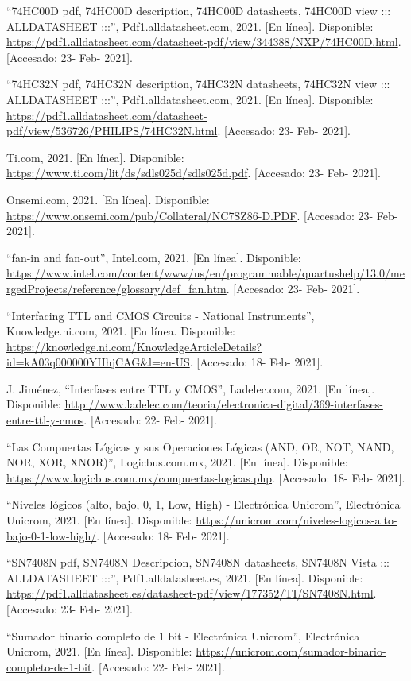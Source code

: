 \documentclass[journal]{IEEEtran}
\begin{document}
	\begin{thebibliography}{1}
		
		 “74HC00D pdf, 74HC00D description, 74HC00D datasheets, 74HC00D view ::: ALLDATASHEET :::”, Pdf1.alldatasheet.com, 2021. [En línea]. Disponible: \url{https://pdf1.alldatasheet.com/datasheet-pdf/view/344388/NXP/74HC00D.html}. [Accesado: 23- Feb- 2021].
		
		 “74HC32N pdf, 74HC32N description, 74HC32N datasheets, 74HC32N view ::: ALLDATASHEET :::”, Pdf1.alldatasheet.com, 2021. [En línea]. Disponible: \url{https://pdf1.alldatasheet.com/datasheet-pdf/view/536726/PHILIPS/74HC32N.html}. [Accesado: 23- Feb- 2021].
		
		 Ti.com, 2021. [En línea]. Disponible: \url{https://www.ti.com/lit/ds/sdls025d/sdls025d.pdf}. [Accesado: 23- Feb- 2021].
		
		 Onsemi.com, 2021. [En línea]. Disponible: \url{https://www.onsemi.com/pub/Collateral/NC7SZ86-D.PDF}. [Accesado: 23- Feb- 2021].
		
		 “fan-in and fan-out”, Intel.com, 2021. [En línea]. Disponible: \url{https://www.intel.com/content/www/us/en/programmable/quartushelp/13.0/mergedProjects/reference/glossary/def_fan.htm}. [Accesado: 23- Feb- 2021].
		
		 “Interfacing TTL and CMOS Circuits - National Instruments”, Knowledge.ni.com, 2021. [En línea. Disponible: \url{https://knowledge.ni.com/KnowledgeArticleDetails?id=kA03q000000YHhjCAG&l=en-US}. [Accesado: 18- Feb- 2021].
		
		 J. Jiménez, “Interfases entre TTL y CMOS”, Ladelec.com, 2021. [En línea]. Disponible: \url{http://www.ladelec.com/teoria/electronica-digital/369-interfases-entre-ttl-y-cmos}. [Accesado: 22- Feb- 2021].
		
		 “Las Compuertas Lógicas y sus Operaciones Lógicas (AND, OR, NOT, NAND, NOR, XOR, XNOR)”, Logicbus.com.mx, 2021. [En línea]. Disponible: \url{https://www.logicbus.com.mx/compuertas-logicas.php}. [Accesado: 18- Feb- 2021].
		
		 “Niveles lógicos (alto, bajo, 0, 1, Low, High) - Electrónica Unicrom”, Electrónica Unicrom, 2021. [En línea]. Disponible: \url{https://unicrom.com/niveles-logicos-alto-bajo-0-1-low-high/}. [Accesado: 18- Feb- 2021].
		
		 “SN7408N pdf, SN7408N Descripcion, SN7408N datasheets, SN7408N Vista ::: ALLDATASHEET :::”, Pdf1.alldatasheet.es, 2021. [En línea]. Disponible: \url{https://pdf1.alldatasheet.es/datasheet-pdf/view/177352/TI/SN7408N.html}. [Accesado: 23- Feb- 2021].
		
		 “Sumador binario completo de 1 bit - Electrónica Unicrom”, Electrónica Unicrom, 2021. [En línea]. Disponible: \url{https://unicrom.com/sumador-binario-completo-de-1-bit}. [Accesado: 22- Feb- 2021].
		
	\end{thebibliography}
	
\end{document}

